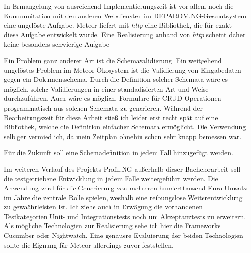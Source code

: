 In Ermangelung von ausreichend Implementierungszeit ist vor allem noch die
Kommunitation mit den anderen Webdiensten im DEPAROM.NG-Gesamtsystem eine
ungelöste Aufgabe. Meteor liefert mit \textit{http} eine Bibliothek, die für
exakt diese Aufgabe entwickelt wurde. Eine Realisierung anhand von \textit{http}
scheint daher keine besonders schwierige Aufgabe.

Ein Problem ganz anderer Art ist die Schemavalidierung. Ein weitgehend
ungelöstes Problem im Meteor-Ökosystem ist die Validierung von Eingabedaten
gegen ein Dokumentschema. Durch die Definition solcher Schemata wäre es möglich,
solche Validierungen in einer standadisierten Art und Weise durchzuführen. Auch
wäre es möglich, Formulare für CRUD-Operationen programmatisch aus solchen
Schemata zu generieren. Während der Bearbeitungszeit für diese Arbeit stieß ich
leider erst recht spät auf eine Bibliothek, welche die Definition einfacher
Schemata ermöglicht. Die Verwendung selbiger vermied ich, da mein Zeitplan
ohnehin schon sehr knapp bemessen war.

Für die Zukunft soll eine Schemadefinition in jedem Fall hinzugefügt werden.

Im weiteren Verlauf des Projekts Profil.NG außerhalb dieser Bachelorarbeit soll
die testgetriebene Entwicklung in jedem Falle weitergeführt werden. Die
Anwendung wird für die Generierung von mehreren hunderttausend Euro Umsatz im
Jahre die zentrale Rolle spielen, weshalb eine reibungslose Weiterentwicklung zu
gewaährleisten ist. Ich ziehe auch in Erwägung die vorhandenen Testkategorien
Unit- und Integrationstests noch um Akzeptanztests zu erweitern. Als mögliche
Technologien zur Realisierung sehe ich hier die Frameworks Cucumber oder
Nightwatch. Eine genauere Evaluierung der beiden Technologien sollte die Eignung
für Meteor allerdings zuvor feststellen.
